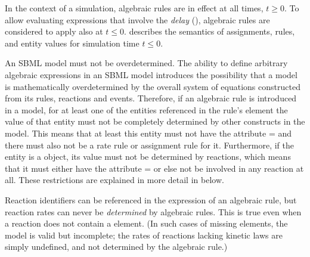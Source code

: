 In the context of a simulation, algebraic rules are in effect at
all times, $t \geq 0$.  To allow evaluating expressions that
involve the \emph{delay} 
(), algebraic rules are considered
to apply also at $t \leq 0$.  
describes the semantics of assignments, rules, and entity values
for simulation time $t \leq 0$.

An SBML model must not be overdetermined.  The ability to define
arbitrary algebraic expressions in an SBML model introduces the
possibility that a model is mathematically overdetermined by the
overall system of equations constructed from its rules, reactions
and events.  Therefore, if an algebraic rule is introduced in a
model, for at least one of the entities referenced in the rule's
 element the value of that entity must not be
completely determined by other constructs in the model.  This
means that at least this entity must not have the attribute
= and there must also not be a rate rule
or assignment rule for it.  Furthermore, if the entity is a
\Species object, its value must not be determined by reactions,
which means that it must either have the attribute
= or else not be involved in
any reaction at all.  These restrictions are explained in more
detail in  below.

Reaction identifiers can be referenced in the  
expression of an algebraic rule, but reaction rates can never be
\emph{determined} by algebraic rules.  This is true even when a
reaction does not contain a \KineticLaw element.  (In such cases
of missing \KineticLaw elements, the model is valid but 
incomplete; the rates of reactions lacking kinetic laws are
simply undefined, and not determined by the algebraic rule.)




